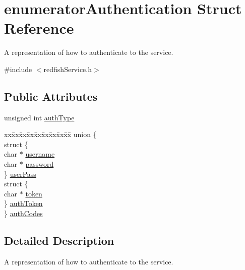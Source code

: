 \hypertarget{structenumeratorAuthentication}{}\section{enumerator\+Authentication Struct Reference}
\label{structenumeratorAuthentication}


A representation of how to authenticate to the service.  




{\ttfamily \#include $<$redfish\+Service.\+h$>$}

\subsection*{Public Attributes}
\begin{DoxyCompactItemize}
\item 
unsigned int \hyperlink{structenumeratorAuthentication_a588159b44ece4dbedc9f5f738c9dd3b5}{auth\+Type}
\item 
\begin{tabbing}
xx\=xx\=xx\=xx\=xx\=xx\=xx\=xx\=xx\=\kill
union \{\\
\>struct \{\\
\>\>char $\ast$ \hyperlink{structenumeratorAuthentication_a9a40303876fa5c0adaa29c1037c60d4c}{username}\\
\>\>char $\ast$ \hyperlink{structenumeratorAuthentication_a9c7084686434ee9dd6328c299367d9d4}{password}\\
\>\} \hyperlink{structenumeratorAuthentication_aa203643dc4f82f99f59a42888722e615}{userPass}\\
\>struct \{\\
\>\>char $\ast$ \hyperlink{structenumeratorAuthentication_a13d0603779b5edc0bd2ed8dcf4d7a651}{token}\\
\>\} \hyperlink{structenumeratorAuthentication_a9483024312ed7d30682e7c59f62f8bff}{authToken}\\
\} \hyperlink{structenumeratorAuthentication_a6fd390d5d377409355f4493cf46698d4}{authCodes}\\

\end{tabbing}\end{DoxyCompactItemize}


\subsection{Detailed Description}
A representation of how to authenticate to the service. 


